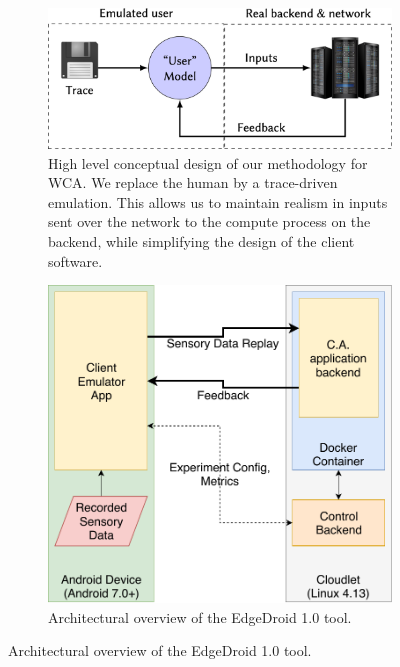 \begin{figure}
    \centering
    \begin{subfigure}[b]{.47\textwidth}
        \centering
        \includegraphics[width=\textwidth]{Figs/trace_edgedroid.png}
        \caption{%
            High level conceptual design of our methodology for \gls{WCA}.
            We replace the human by a trace-driven emulation.
            This allows us to maintain realism in inputs sent over the network to the compute process on the backend, while simplifying the design of the client software.
        }
    \end{subfigure}
    \hfill
    \begin{subfigure}[b]{.47\textwidth}
        \centering
        \includegraphics[width=\textwidth]{publications/2018DemoScalingOnTheEdge/img/TraceReplay_GenArch}
        \caption{%
            Architectural overview of the EdgeDroid \num{1.0} tool.
}
\end{subfigure}
\end{figure}
